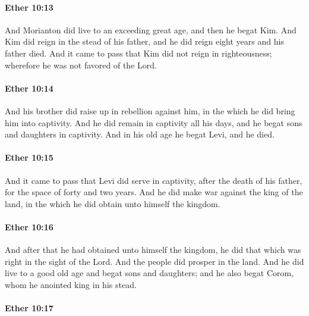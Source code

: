 		\paragraph{Ether 10:13} %
			\label{ETHER-10-13}

			And Morianton did live to an exceeding great age,
			and then he begat Kim.
			And Kim did reign in the stead of his father,
			and he did reign eight years and his father died.
			And it came to pass that Kim did not reign in righteousness;
			wherefore he was not favored of the Lord.

		\paragraph{Ether 10:14} %
			\label{ETHER-10-14}

			And his brother did raise up in rebellion against him,
			in the which he did bring him into captivity.
			And he did remain in captivity all his days,
			and he begat sons and daughters in captivity.
			And in his old age he begat Levi,
			and he died.

		\paragraph{Ether 10:15} %
			\label{ETHER-10-15}

			And it came to pass that Levi did serve in captivity,
			after the death of his father,
			for the space of forty and two years.
			And he did make war against the king of the land,
			in the which he did obtain unto himself the kingdom.

		\paragraph{Ether 10:16} %
			\label{ETHER-10-16}

			And after that he had obtained unto himself the kingdom,
			he did that which was right in the sight of the Lord.
			And the people did prosper in the land.
			And he did live to a good old age and begat sons and daughters;
			and he also begat Corom, whom he anointed king in his stead.

		\paragraph{Ether 10:17} %
			\label{ETHER-10-17}

